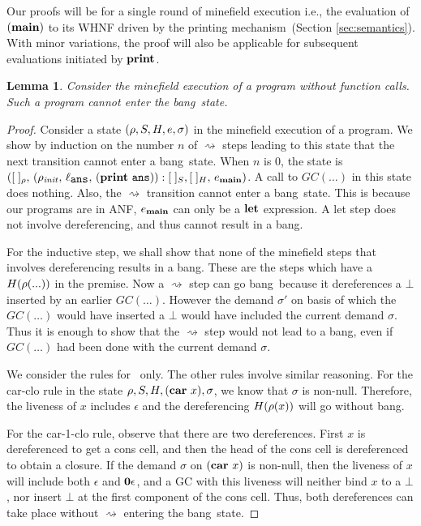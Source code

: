 \documentclass[9pt,nonatbib]{sigplanconf}
\newcommand{\bang}{\mbox{\sc bang}}
\newtheorem{lemma}[theorem]{Lemma}
\begin{document}
Our proofs will be for a single round of minefield execution i.e., the
evaluation  of  $(\mathbf{main})$  to  its  WHNF  driven  by  the  printing
mechanism~(Section \ref{sec:semantics}).   With minor  variations, the
proof will also be applicable  for subsequent evaluations initiated by
$\mathbf{print}$.
%
\begin{lemma}
\label{lemma:call-less-cannot-go-bang}
Consider the minefield execution of  a program without function calls.
Such a program cannot enter the \bang\ state.
\end{lemma}
\begin{proof}
Consider a  state  $(\rho,  S,  H,  e, \sigma)$  in  the
minefield execution of a program.  We  show by induction on the number $n$
of $\rightsquigarrow$ steps  leading to  this state  that the next  transition cannot
enter a  \bang\ state.   When $n$  is 0,  the state  is $([\;]_\rho,\,
(\rho_\mathit{init},   \,  \ell_{\mathbf{\mbox{\tt ans}}}   ,\,  (\mathbf{print}~\mathbf{\mbox{\tt ans}})):[\;]_{S},
[\;]_{H},\, e_{\mathbf{main}})$.  A call  to $GC(\ldots)$ in  this state
does  nothing. Also,  the  $\rightsquigarrow$
transition cannot  enter a  \bang\ state.  This is because  our programs  are in
ANF, $e_{\mathbf{main}}$ can only be a $\mbox{$\mathbf{ let}$}$ expression.  A {\sc let} step
does not involve dereferencing, and thus cannot result in a \bang.

For the inductive step, we shall show that none of the minefield steps
that involves dereferencing  results in a \bang.  These  are the steps
which   have   a   $H(\rho(...))$   in   the   premise.    Now   a
$\rightsquigarrow$ step can go \bang\ because it dereferences a $\bot$
inserted by an earlier $GC(\ldots)$.   However the demand $\sigma'$  on basis of
which the $GC(\ldots)$ would have inserted a  $\bot$ would have
included the  current demand $\sigma$.     Thus it is
enough to  show that the $\rightsquigarrow$ step would not lead to a
\bang, even if $GC(\ldots)$ had been done with the current demand
$\sigma$.

We consider the rules for \CAR\  only.  
The other rules involve similar reasoning. For the {\sc
  car-clo}  rule in  the state  $\rho, S,  H, (\mbox{$\mathbf{car}$}~x),
\sigma$, we  know that $\sigma$ is  non-null. Therefore,
the  liveness  of  $x$  includes  $\epsilon$  and  the
dereferencing $H(\rho(x))$ will go without \bang.

For the  {\sc car-1-clo}  rule, observe that  there are
two dereferences.  First $x$  is dereferenced to  get a
cons  cell,  and then  the  head  of  the cons  cell  is
dereferenced  to  obtain  a  closure.   If  the  demand
$\sigma$ on  $(\mbox{$\mathbf{car}$}~x)$ is non-null, then  the liveness
of    $x$   will    include    both   $\epsilon$    and
$\mathbf{0}\epsilon$,  and  a  GC with  this  liveness  will
neither bind $x$ to a  $\bot$, nor insert $\bot$ at the
first   component  of   the   cons   cell.  Thus,   both
dereferences    can take place without 
$\rightsquigarrow$ entering the   \bang\ state.
\end{proof} \vspace*{-1mm}
\end{document}
